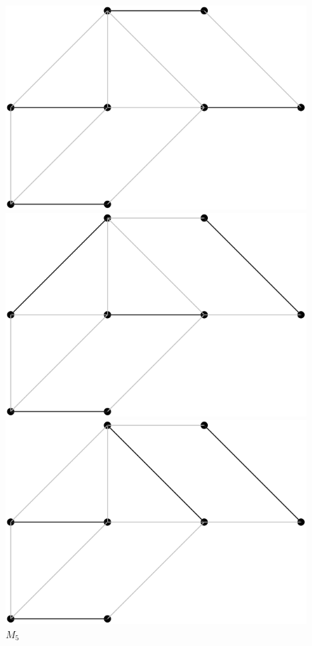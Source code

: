 \documentclass[12pt]{article}
\begin{document}
\begin{figure}
    \centering
    \includegraphics[scale = 0.4]{images/G_example_M3.png}
    \caption{$M_3$}
    \includegraphics[scale = 0.4]{images/G_example_M4.png}
    \caption{$M_4$}
    \includegraphics[scale = 0.4]{images/G_example_M5.png}
    \caption{$M_5$}
\end{figure}
\end{document}
